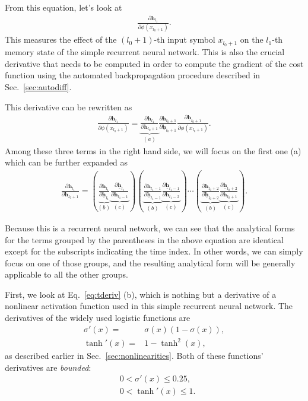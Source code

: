 \documentclass{report}
\newcommand{\vect}[1]{\mathbf{#1}}
\newcommand{\vh}[0]{\vect{h}}
\begin{document}
From this equation, let's look at 
\begin{align*}
    \frac{\partial \vh_{l_1}}{\partial \phi\left(x_{l_0+1}\right)}.
\end{align*}
This measures the effect of the $(l_0+1)$-th input symbol $x_{l_0+1}$ on the
$l_1$-th memory state of the simple recurrent neural network. This is also the
crucial derivative that needs to be computed in order to compute the gradient of
the cost function using the automated backpropagation procedure described in
Sec.~\ref{sec:autodiff}.

This derivative can be rewritten as
\begin{align*}
    \frac{\partial \vh_{l_1}}{\partial \phi\left(x_{l_0+1}\right)} = 
    \underbrace{\frac{\partial \vh_{l_1}}{\partial
    \vh_{l_0+1}}}_{(a)}
    \frac{\partial \vh_{l_0+1}}{\partial \underline{\vh}_{l_0+1}}
    \frac{\partial \underline{\vh}_{l_0+1}}{\partial
    \phi\left(x_{l_0+1}\right)}.
\end{align*}
Among these three terms in the right hand side, we will focus on the first one
(a) which can be further expanded as
\begin{align}
    \label{eq:tderiv}
    \frac{\partial \vh_{l_1}}{\partial \vh_{l_0+1}} = 
    \left(
    \underbrace{\frac{\partial \vh_{l_1}}{\partial \underline{\vh}_{l_1}}}_{(b)}
    \underbrace{\frac{\partial \underline{\vh}_{l_1}}{\partial \vh_{l_1-1}}}_{(c)}
\right)
\left(
    \underbrace{\frac{\partial \vh_{l_1-1}}{\partial
    \underline{\vh}_{l_1-1}}}_{(b)}
        \underbrace{\frac{\partial \underline{\vh}_{l_1-1}}{\partial
        \vh_{l_1-2}}}_{(c)}
\right)
    \cdots
\left(
    \underbrace{\frac{\partial \vh_{l_0+2}}{\partial
    \underline{\vh}_{l_0+2}}}_{(b)}
        \underbrace{\frac{\partial \underline{\vh}_{l_0+2}}{\partial
        \vh_{l_0+1}}}_{(c)}
    \right).
\end{align}

Because this is a recurrent neural network, we can see that the analytical forms
for the terms grouped by the parentheses in the above equation are identical
except for the subscripts indicating the time index. In other words, we can
simply focus on one of those groups, and the resulting analytical form will be
generally applicable to all the other groups.

First, we look at Eq.~\eqref{eq:tderiv} (b), which is nothing but a derivative
of a nonlinear activation function used in this simple recurrent neural network.
The derivatives of the widely used logistic functions are 
\begin{align*}
    \sigma'(x) =& \sigma(x) (1 - \sigma(x)), \\
    \tanh'(x) =& 1 - \tanh^2(x),
\end{align*}
as described earlier in Sec.~\ref{sec:nonlinearities}. 
Both of these functions' derivatives are {\em bounded}:
\begin{align}
    \label{eq:sigmoid_bound}
    &0 < \sigma'(x) \leq 0.25, \\
    \label{eq:tanh_bound}
    &0 < \tanh'(x) \leq 1.
\end{align}
\end{document}
